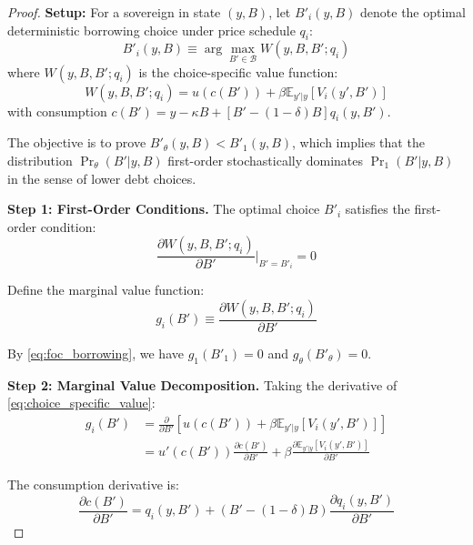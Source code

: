 \documentclass[12pt]{article}
\theoremstyle{plain}
\begin{document}
\begin{proof}
	\textbf{Setup:} For a sovereign in state $(y,B)$, let $B'_i(y, B)$ denote the optimal deterministic borrowing choice under price schedule $q_i$:
	\begin{equation}
		B'_i(y, B) \equiv \arg\max_{B' \in \mathcal{B}} W(y, B, B'; q_i) \label{eq:optimal_deterministic_choice}
	\end{equation}
	where $W(y, B, B'; q_i)$ is the choice-specific value function:
	\begin{equation}
		W(y, B, B'; q_i) = u(c(B')) + \beta \mathbb{E}_{y'|y}[V_i(y', B')] \label{eq:choice_specific_value}
	\end{equation}
	with consumption $c(B') = y - \kappa B + [B' - (1-\delta)B]q_i(y, B')$.

	The objective is to prove $B'_\theta(y,B) < B'_1(y,B)$, which implies that the
	distribution $\Pr_\theta(B'|y,B)$ first-order stochastically dominates
	$\Pr_1(B'|y,B)$ in the sense of lower debt choices.

	\textbf{Step 1: First-Order Conditions.} The optimal choice $B'_i$ satisfies the first-order condition:
	\begin{equation}
		\frac{\partial W(y,B,B'; q_i)}{\partial B'}\bigg|_{B'=B'_i} = 0 \label{eq:foc_borrowing}
	\end{equation}

	Define the marginal value function:
	\begin{equation}
		g_i(B') \equiv \frac{\partial W(y,B,B'; q_i)}{\partial B'} \label{eq:marginal_value_definition}
	\end{equation}

	By \eqref{eq:foc_borrowing}, we have $g_1(B'_1) = 0$ and $g_\theta(B'_\theta) =
		0$.

	\textbf{Step 2: Marginal Value Decomposition.} Taking the derivative of \eqref{eq:choice_specific_value}:
	\begin{align}
		g_i(B') & = \frac{\partial}{\partial B'} \left[ u(c(B')) + \beta \mathbb{E}_{y'|y}[V_i(y', B')] \right] \nonumber                                              \\
		        & = u'(c(B')) \frac{\partial c(B')}{\partial B'} + \beta \frac{\partial \mathbb{E}_{y'|y}[V_i(y', B')]}{\partial B'} \label{eq:marginal_decomposition}
	\end{align}

	The consumption derivative is:
	\begin{equation}
		\frac{\partial c(B')}{\partial B'} = q_i(y,B') + (B' - (1-\delta)B)\frac{\partial q_i(y,B')}{\partial B'} \label{eq:consumption_derivative}
	\end{equation}


\end{proof}
\end{document}
